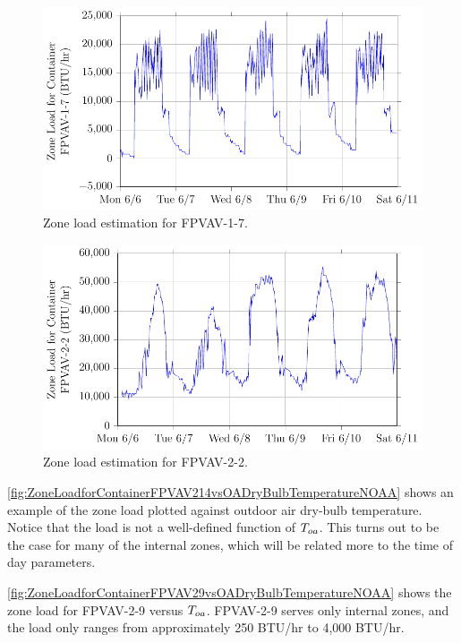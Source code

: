 \begin{figure}
\centering
\includegraphics[]{Plots/2016-06-22-1654-ZoneLoadforContainerFPVAV17-TikzData.pdf}
\caption{Zone load estimation for FPVAV-1-7.}
\label{fig:2016-06-22-1654-ZoneLoadforContainerFPVAV17-TikzData}
\end{figure}

\begin{figure}
\centering
\includegraphics[]{Plots/2016-06-22-1643-ZoneLoadforContainerFPVAV22-TikzData.pdf}
\caption{Zone load estimation for FPVAV-2-2.}
\label{fig:2016-06-22-1643-ZoneLoadforContainerFPVAV22-TikzData}
\end{figure}



\figref{}
\ref{fig:ZoneLoadforContainerFPVAV214vsOADryBulbTemperatureNOAA} shows
an example of the zone load plotted against outdoor air dry-bulb
temperature. Notice that the load is not a well-defined function of
\(T_{oa}\). This turns out to be the case for many of the internal zones,
which will be related more to the time of day parameters. 

\figref{}
\ref{fig:ZoneLoadforContainerFPVAV29vsOADryBulbTemperatureNOAA} shows
the zone load for FPVAV-2-9 versus \(T_{oa}\). FPVAV-2-9 serves only
internal zones, and the load only ranges from approximately 250 BTU/hr
to 4,000 BTU/hr.


